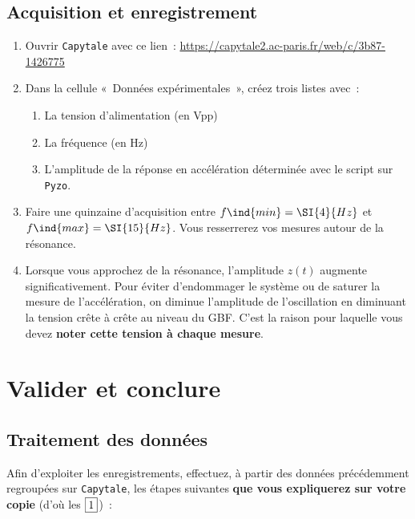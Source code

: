 \documentclass[a4paper, 11pt, final, garamond]{book}
\begin{document}
\subsection{Acquisition et enregistrement}

\begin{enumerate}
    \item Ouvrir \texttt{Capytale} avec ce lien~:
        \url{https://capytale2.ac-paris.fr/web/c/3b87-1426775}
    \item Dans la cellule «~Données expérimentales~», créez trois listes avec~:
        \begin{enumerate}
            \item La tension d'alimentation (en \si{Vpp})
            \item La fréquence (en \si{Hz})
            \item L'amplitude de la réponse en accélération déterminée avec le
                script sur \texttt{Pyzo}.
        \end{enumerate}
    \item Faire une quinzaine d'acquisition entre $f\ind{min} = \SI{4}{Hz}$ et
        $f\ind{max} = \SI{15}{Hz}$. Vous resserrerez vos mesures autour de
        la résonance.
    \item Lorsque vous approchez de la résonance, l'amplitude $z(t)$ augmente
        significativement. Pour éviter d'endommager le système ou de saturer la
        mesure de l'accélération, on diminue l'amplitude de l'oscillation 
        en diminuant la tension crête à crête au niveau du GBF. C'est la raison
        pour laquelle vous devez \textbf{noter cette tension à chaque mesure}.  
\end{enumerate}

\section{Valider et conclure}
\subsection{Traitement des données}
Afin d'exploiter les enregistrements, effectuez, à partir des données
précédemment regroupées sur \texttt{Capytale}, les étapes suivantes \textbf{que
vous expliquerez sur votre copie} (d'où les $\fbox{1}$)~:
\end{document}
